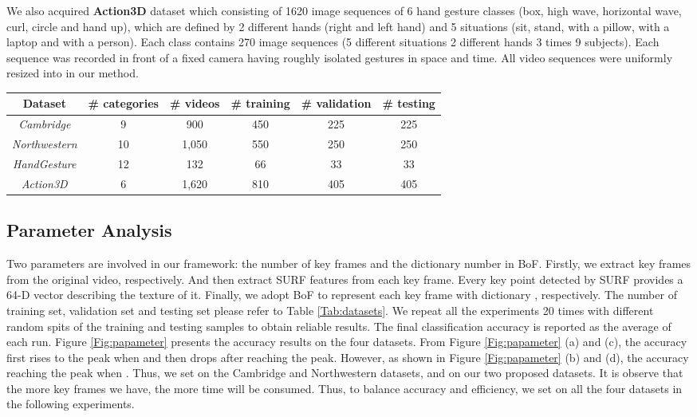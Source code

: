\documentclass[5p]{elsarticle}
\begin{document}
We also acquired \textbf{Action3D} dataset which consisting of 1620 image sequences of 6 hand gesture classes (box, high wave, horizontal wave, curl, circle and hand up), which are defined by 2 different hands (right and left hand) and 5 situations (sit, stand, with a pillow, with a laptop and with a person).
Each class contains 270 image sequences (5 different situations  2 different hands  3 times  9 subjects).
Each sequence was recorded in front of a fixed camera having roughly isolated gestures in space and time.
All video sequences were uniformly resized into  in our method.

\begin{table*}[!tbp]
	\centering
	\caption{Characteristics of the datasets used in our hand gesture recognition experiments.}
\begin{tabular}{c|c|c|c|c|c} \hline
		Dataset                        & \# categories & \# videos & \# training  & \# validation & \# testing \\ \hline
		\emph{Cambridge}       & 9             & 900       & 450          & 225            & 225           \\ \hline
		\emph{Northwestern}  & 10            & 1,050      & 550          & 250            & 250         \\ \hline
		\emph{HandGesture}   & 12            & 132       & 66           & 33             & 33               \\ \hline
		\emph{Action3D}         & 6             & 1,620      & 810          & 405            & 405         \\ \hline
	\end{tabular}
	\label{Tab:datasets}
\end{table*}

\subsection{Parameter Analysis}
Two parameters are involved in our framework: the number of key frames  and the dictionary number  in BoF.
Firstly, we extract  key frames from the original video, respectively.
And then extract SURF features from each key frame.
Every key point detected by SURF provides a 64-D vector describing the texture of it.
Finally, we adopt BoF to represent each key frame with dictionary , respectively.
The number of training set, validation set and testing set please refer to Table \ref{Tab:datasets}.
We repeat all the experiments 20 times with different random spits of the training and testing samples to obtain reliable results.
The final classification accuracy is reported as the average of each run.
Figure \ref{Fig:papameter} presents the accuracy results on the four datasets.
From Figure \ref{Fig:papameter} (a) and (c), the accuracy first rises to the peak when  and then drops after reaching the peak.
However, as shown in Figure \ref{Fig:papameter} (b) and (d), the accuracy reaching the peak when .
Thus, we set  on the Cambridge and Northwestern datasets, and  on our two proposed datasets.
It is observe that the more key frames we have, the more time will be consumed.
Thus, to balance accuracy and efficiency, we set  on all the four datasets in the following experiments.
\end{document}

